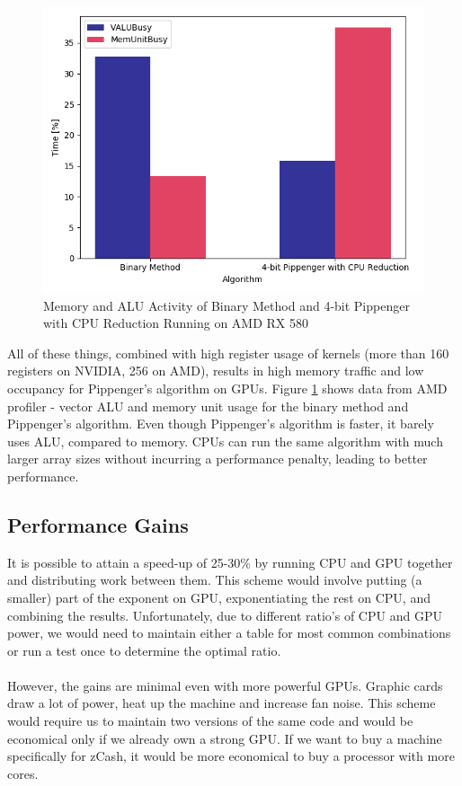 \begin{figure}[h]
    \includegraphics[width=\linewidth]{Figures/profiler.png}
    \caption{Memory and ALU Activity of Binary Method and 4-bit Pippenger with CPU Reduction Running on AMD RX 580}
    \label{fig:profiler}
\end{figure}

All of these things, combined with high register usage of kernels (more than 160 registers on NVIDIA, 256 on AMD), results in high memory traffic and low occupancy for Pippenger's algorithm on GPUs. Figure \ref{fig:profiler} shows data from AMD profiler - vector ALU and memory unit usage for the binary method and Pippenger's algorithm. Even though Pippenger's algorithm is faster, it barely uses ALU, compared to memory. CPUs can run the same algorithm with much larger array sizes without incurring a performance penalty, leading to better performance.

\subsection{Performance Gains}

It is possible to attain a speed-up of 25-30\% by running CPU and GPU together and distributing work between them. This scheme would involve putting (a smaller) part of the exponent on GPU, exponentiating the rest on CPU, and combining the results. Unfortunately, due to different ratio's of CPU and GPU power, we would need to maintain either a table for most common combinations or run a test once to determine the optimal ratio.\\
\\
However, the gains are minimal even with more powerful GPUs. Graphic cards draw a lot of power, heat up the machine and increase fan noise. This scheme would require us to maintain two versions of the same code and would be economical only if we already own a strong GPU. If we want to buy a machine specifically for zCash, it would be more economical to buy a processor with more cores.